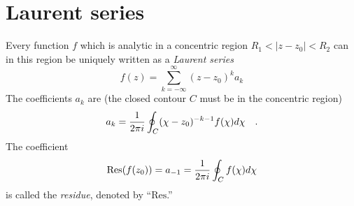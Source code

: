  \section{Laurent series}

Every function $f$ which is analytic in a concentric region
$R_1< \vert z-z_0\vert <R_2$ can in this region be uniquely written as a {\em Laurent series}
 \begin{equation}
f(z)=\sum_{k=-\infty}^\infty (z-z_0)^k a_k
\label{011-m-ch-ca-else1}
\end{equation}
The coefficients $a_k$ are
 (the closed contour $C$ must be in the concentric region)
 \begin{equation}
a_k={1\over 2\pi i}\oint_C (\chi -z_0)^{-k-1}f(\chi ) d\chi \quad.
\end{equation}
The coefficient
\begin{equation}
\textrm{Res}(f(z_0)) = a_{-1}={1\over 2\pi i}\oint_C f(\chi )d\chi
\label{011-m-ch-ca-else2}
\end{equation}
is called the
{\em residue}, denoted by
 ``$\textrm{Res}$.''

